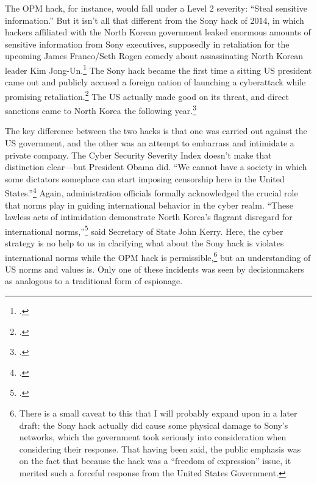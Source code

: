 \documentclass{report}
\begin{document}
\begin{refsegment}
The OPM hack, for instance, would fall under a Level 2 severity: ``Steal sensitive information.'' But it isn't all that different from the Sony hack of 2014, in which hackers affiliated with the North Korean government leaked enormous amounts of sensitive information from Sony executives, supposedly in retaliation for the upcoming James Franco/Seth Rogen comedy about assassinating North Korean leader Kim Jong-Un.\footcite{barnes_sony_2017} The Sony hack became the first time a sitting US president came out and publicly accused a foreign nation of launching a cyberattack while promising retaliation.\footcite{sanger_u.s._2017} The US actually made good on its threat, and direct sanctions came to North Korea the following year.\footcite{lederman_us_2015}

The key difference between the two hacks is that one was carried out against the US government, and the other was an attempt to embarrass and intimidate a private company. The Cyber Security Severity Index doesn't make that distinction clear---but President Obama did. ``We cannot have a society in which some dictators someplace can start imposing censorship here in the United States.''\footcite{perez_obama_2014} Again, administration officials formally acknowledged the crucial role that norms play in guiding international behavior in the cyber realm. ``These lawless acts of intimidation demonstrate North Korea's flagrant disregard for international norms,''\footcite{perez_obama_2014} said Secretary of State John Kerry. Here, the cyber strategy is no help to us in clarifying what about the Sony hack is violates international norms while the OPM hack is permissible,\footnote{There is a small caveat to this that I will probably expand upon in a later draft: the Sony hack actually did cause some physical damage to Sony's networks, which the government took seriously into consideration when considering their response. That having been said, the public emphasis was on the fact that because the hack was a ``freedom of expression'' issue, it merited such a forceful response from the United States Government.} but an understanding of US norms and values is. Only one of these incidents was seen by decisionmakers as analogous to a traditional form of espionage.


\end{refsegment}
\end{document}
